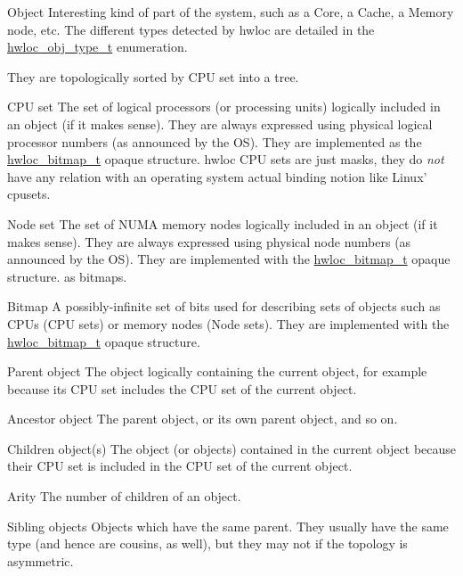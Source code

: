 
\begin{DoxyDescription}
\item[Object ]Interesting kind of part of the system, such as a Core, a Cache, a Memory node, etc. The different types detected by hwloc are detailed in the \hyperlink{a00041_gacd37bb612667dc437d66bfb175a8dc55}{hwloc\_\-obj\_\-type\_\-t} enumeration.

They are topologically sorted by CPU set into a tree. 


\item[CPU set ]The set of logical processors (or processing units) logically included in an object (if it makes sense). They are always expressed using physical logical processor numbers (as announced by the OS). They are implemented as the \hyperlink{a00065_gaa3c2bf4c776d603dcebbb61b0c923d84}{hwloc\_\-bitmap\_\-t} opaque structure. hwloc CPU sets are just masks, they do {\itshape not\/} have any relation with an operating system actual binding notion like Linux' cpusets.


\item[Node set ]The set of NUMA memory nodes logically included in an object (if it makes sense). They are always expressed using physical node numbers (as announced by the OS). They are implemented with the \hyperlink{a00065_gaa3c2bf4c776d603dcebbb61b0c923d84}{hwloc\_\-bitmap\_\-t} opaque structure. as bitmaps.


\item[Bitmap ]A possibly-\/infinite set of bits used for describing sets of objects such as CPUs (CPU sets) or memory nodes (Node sets). They are implemented with the \hyperlink{a00065_gaa3c2bf4c776d603dcebbb61b0c923d84}{hwloc\_\-bitmap\_\-t} opaque structure. 


\item[Parent object ]The object logically containing the current object, for example because its CPU set includes the CPU set of the current object.


\item[Ancestor object ]The parent object, or its own parent object, and so on.


\item[Children object(s) ]The object (or objects) contained in the current object because their CPU set is included in the CPU set of the current object.


\item[Arity ]The number of children of an object.


\item[Sibling objects ]Objects which have the same parent. They usually have the same type (and hence are cousins, as well), but they may not if the topology is asymmetric.



\end{DoxyDescription}
